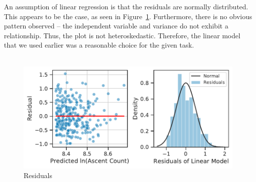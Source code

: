 \documentclass[11pt,a4paper]{article}
\begin{document}
An assumption of linear regression is that the residuals are normally distributed. This appears to be the case, as seen in Figure~\ref{fds-project-template:fig:uni_residuals}. Furthermore, there is no obvious pattern observed – the independent variable and variance do not exhibit a relationship. 
Thus, the plot is not heteroskedastic. Therefore, the linear model that we used earlier was a reasonable choice for the given task.\\ \\
\begin{figure} [h!]
  \centering
  \includegraphics{report/uni_residuals.pdf}
  \caption{Residuals}
  \label{fds-project-template:fig:uni_residuals}
\end{figure} \\ \\
\end{document}

